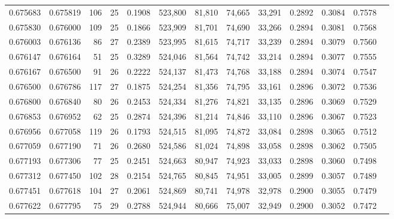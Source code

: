 \begin{tabular}{rrrrrrrrrrrrr}
0.675683 & 0.675819 &   106 &  25 &                                     0.1908 & 523,800 &  81,810 &  74,665 &  33,291 & 0.2892 & 0.3084 & 0.7578 \\
0.675830 & 0.676000 &   109 &  25 &                                     0.1866 & 523,909 &  81,701 &  74,690 &  33,266 & 0.2894 & 0.3081 & 0.7568 \\
0.676003 & 0.676136 &    86 &  27 &                                     0.2389 & 523,995 &  81,615 &  74,717 &  33,239 & 0.2894 & 0.3079 & 0.7560 \\
0.676147 & 0.676164 &    51 &  25 &                                     0.3289 & 524,046 &  81,564 &  74,742 &  33,214 & 0.2894 & 0.3077 & 0.7555 \\
0.676167 & 0.676500 &    91 &  26 &                                     0.2222 & 524,137 &  81,473 &  74,768 &  33,188 & 0.2894 & 0.3074 & 0.7547 \\
0.676500 & 0.676786 &   117 &  27 &                                     0.1875 & 524,254 &  81,356 &  74,795 &  33,161 & 0.2896 & 0.3072 & 0.7536 \\
0.676800 & 0.676840 &    80 &  26 &                                     0.2453 & 524,334 &  81,276 &  74,821 &  33,135 & 0.2896 & 0.3069 & 0.7529 \\
0.676853 & 0.676952 &    62 &  25 &                                     0.2874 & 524,396 &  81,214 &  74,846 &  33,110 & 0.2896 & 0.3067 & 0.7523 \\
0.676956 & 0.677058 &   119 &  26 &                                     0.1793 & 524,515 &  81,095 &  74,872 &  33,084 & 0.2898 & 0.3065 & 0.7512 \\
0.677059 & 0.677190 &    71 &  26 &                                     0.2680 & 524,586 &  81,024 &  74,898 &  33,058 & 0.2898 & 0.3062 & 0.7505 \\
0.677193 & 0.677306 &    77 &  25 &                                     0.2451 & 524,663 &  80,947 &  74,923 &  33,033 & 0.2898 & 0.3060 & 0.7498 \\
0.677312 & 0.677450 &   102 &  28 &                                     0.2154 & 524,765 &  80,845 &  74,951 &  33,005 & 0.2899 & 0.3057 & 0.7489 \\
0.677451 & 0.677618 &   104 &  27 &                                     0.2061 & 524,869 &  80,741 &  74,978 &  32,978 & 0.2900 & 0.3055 & 0.7479 \\
0.677622 & 0.677795 &    75 &  29 &                                     0.2788 & 524,944 &  80,666 &  75,007 &  32,949 & 0.2900 & 0.3052 & 0.7472 \\

\end{tabular}
